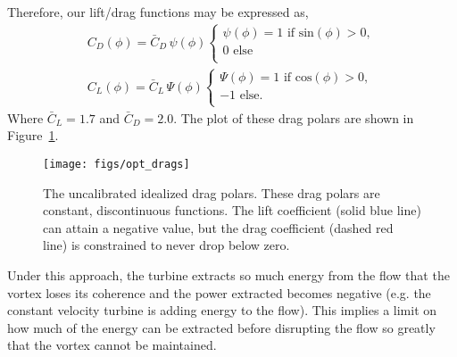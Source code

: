 Therefore, our lift/drag functions may be expressed as,
\begin{align*} 
 C_D(\phi) = \bar C_D \, \psi(\phi) 
  \begin{cases}
   \psi(\phi) = 1 \text{ if sin}(\phi) > 0,   \\
   0 \text{ else} \\
  \end{cases} \\
 C_L(\phi) = \bar C_L \, \Psi(\phi) 
  \begin{cases}
   \Psi(\phi) = 1 \text{ if cos}(\phi) > 0,   \\
   -1 \text{ else}. \\
  \end{cases}
\end{align*}
Where $\bar C_L = 1.7$ and $\bar C_D = 2.0$. The plot of these drag
polars are shown in Figure~\ref{drags}. 

\begin{figure}[!htb]
  \begin{center}
    \texttt{[image: figs/opt\_drags]}
    \caption{The uncalibrated idealized drag polars. 
   These drag polars are constant, discontinuous functions. The lift
   coefficient (solid blue line) can attain a negative value, but the
   drag coefficient (dashed red line) is constrained to never drop below
   zero.}  
    \label{drags}
  \end{center}
\end{figure}


Under this approach, the turbine extracts so much energy from the flow
that the vortex loses its coherence and the power extracted becomes
negative (e.g. the constant velocity turbine is adding energy to the
flow). This implies a limit on how much of the energy can be extracted
before disrupting the flow so greatly that the vortex cannot be
maintained.

